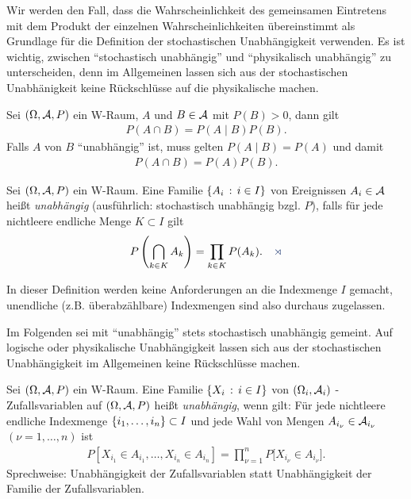 Wir werden den Fall, dass die Wahrscheinlichkeit des gemeinsamen Eintretens mit
dem Produkt der einzelnen Wahrscheinlichkeiten übereinstimmt als Grundlage für
die Definition der stochastischen Unabhängigkeit verwenden. 
Es ist wichtig, zwischen ``stochastisch unabhängig'' und ``physikalisch
unabhängig'' zu unterscheiden, denn im Allgemeinen lassen sich aus der
stochastischen Unabhänigkeit keine Rückschlüsse auf die physikalische machen.

Sei $(\Omega,\AA,P)$ ein W-Raum, $A$ und $B\in\AA$ mit $P(B)>0$, dann gilt
\begin{align*}
P(A\cap B) = P(A\mid B)P(B).
\end{align*}
Falls $A$ von $B$ ``unabhängig'' ist, muss gelten $P(A\mid B)=P(A)$ und damit
\begin{align*}
P(A\cap B) = P(A)P(B).
\end{align*} 

\begin{defn}
\label{defn:5.1}
Sei $(\Omega,\AA, P)$ ein W-Raum. Eine Familie $\setdef{A_{i}}
{i \in I}$ von Ereignissen $A_{i} \in \AA$ heißt \emph{unabhängig}
(ausführlich: stochastisch unabhängig bzgl. $P$), falls für jede nichtleere
endliche Menge $K\subset I$ gilt
\begin{align*}
P\left(\bigcap_{k\in K }A_{k}\right)
  = \prod\limits_{k\in K}P(A_{k}).\fishhere
\end{align*}
\end{defn}

In dieser Definition werden keine Anforderungen an die Indexmenge $I$ gemacht,
unendliche (z.B. überabzählbare) Indexmengen sind also durchaus zugelassen.

Im Folgenden sei mit ``unabhängig'' stets stochastisch unabhängig gemeint. Auf
logische oder physikalische Unabhängigkeit lassen sich aus der stochastischen
Unabhängigkeit im Allgemeinen keine Rückschlüsse machen.

\begin{defn}
\label{defn:5.2}
Sei $(\Omega,  \AA,P)$ ein W-Raum. Eine Familie $\setdef{X_{i}}
{i\in I}$ von $(\Omega_{i}, \AA_{i})$ - Zufallsvariablen auf $(\Omega, \AA, P)$
heißt \emph{unabhängig}, wenn gilt: Für jede nichtleere endliche Indexmenge
$\setd{i_{1},\ldots, i_{n}}\subset I$ und jede Wahl von Mengen
$A_{i_{\nu}}\in \AA_{i_{\nu}}$ $(\nu = 1,\ldots,n)$ ist
\begin{align*}
P\left[ X_{i_{1}} \in A_{i_{1}},\ldots,X_{i_{n}} \in A_{i_{n}}\right] =
\prod\limits_{\nu =1}^ {n} P\big[X_{i_{\nu}} \in A_{i_{\nu}}\big].
\end{align*}
Sprechweise: Unabhängigkeit der Zufallsvariablen statt Unabhängigkeit der Familie der
Zufallsvariablen.\fishhere
\end{defn}

